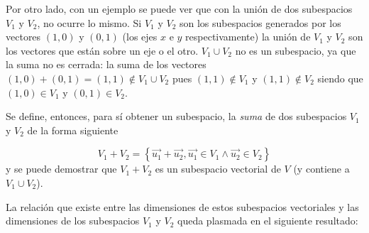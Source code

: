Por otro lado, con un ejemplo se puede ver que con la unión de  dos subespacios $V_1$ y $V_2$, no ocurre lo mismo.   Si $V_1$ y $V_2$ son los subespacios generados por los vectores $(1,0)$ y $(0,1)$ (los ejes $x$ e $y$ respectivamente) la unión de $V_1$ y $V_2$ son los vectores  que están sobre un eje o el otro. $V_1\cup V_2$ no es un subespacio, ya que la suma no es cerrada: la suma de los vectores $(1,0)+(0,1)= (1,1) \notin V_1\cup V_2$ pues $(1,1) \notin V_1$ y $(1,1) \notin V_2$ siendo que $(1,0) \in V_1$ y $(0,1) \in V_2$.

Se define, entonces, para sí obtener un subespacio, la  \textit{suma} de dos subespacios $V_1$ y $V_2$ de la forma siguiente

$$V_1+V_2=\left\{\vec{u_1}+ \vec{u_2},\vec{u_1} \in V_1 \wedge \vec{u_2} \in V_2 \right\}$$
\noindent
y se puede demostrar  que $V_1+V_2$ es un subespacio vectorial de $V$ (y contiene a  $V_1\cup V_2$).

\bigskip

La relación que existe entre las dimensiones de estos subespacios vectoriales y las dimensiones de los subespacios $V_1$ y $V_2$ queda plasmada en el siguiente resultado:

\bigskip

